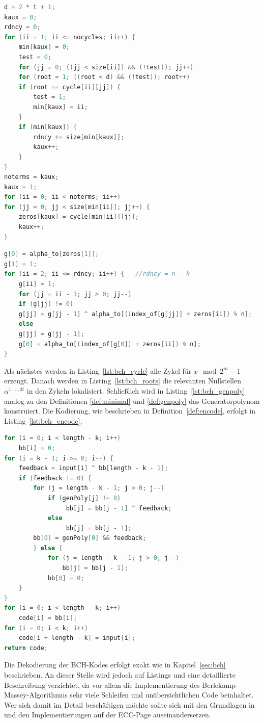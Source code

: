 \begin{lstlisting}[caption=Suchen der Nullstellen in den Zykeln, label={lst:bch_roots}, language=C++]
d = 2 * t + 1;
kaux = 0;
rdncy = 0;
for (ii = 1; ii <= nocycles; ii++) {
    min[kaux] = 0;
    test = 0;
    for (jj = 0; ((jj < size[ii]) && (!test)); jj++)
    for (root = 1; ((root < d) && (!test)); root++)
    if (root == cycle[ii][jj]) {
        test = 1;
        min[kaux] = ii;
    }
    if (min[kaux]) {
        rdncy += size[min[kaux]];
        kaux++;
    }
}
noterms = kaux;
kaux = 1;
for (ii = 0; ii < noterms; ii++)
for (jj = 0; jj < size[min[ii]]; jj++) {
    zeros[kaux] = cycle[min[ii]][jj];
    kaux++;
}
\end{lstlisting}

\begin{lstlisting}[caption=Konstruieren den Generatorpolynoms, label={lst:bch_genpoly}, language=C++]
g[0] = alpha_to[zeros[1]];
g[1] = 1;
for (ii = 2; ii <= rdncy; ii++) {	//rdncy = n - k
    g[ii] = 1;
    for (jj = ii - 1; jj > 0; jj--)
    if (g[jj] != 0)
    g[jj] = g[jj - 1] ^ alpha_to[(index_of[g[jj]] + zeros[ii]) % n];
    else
    g[jj] = g[jj - 1];
    g[0] = alpha_to[(index_of[g[0]] + zeros[ii]) % n];
}
\end{lstlisting}



Als nächstes werden in Listing~\ref{lst:bch_cycle} alle Zykel für $x \mod 2^m-1$ erzeugt. Danach werden in Listing~\ref{lst:bch_roots} die relevanten Nullstellen $\alpha^{1,...,2t}$ in den Zykeln lokalisiert. Schließlich wird in Listing~\ref{lst:bch_genpoly} analog zu den Definitionen \ref{def:minimal} und \ref{def:genpoly} das Generatorpolynom konstruiert. Die Kodierung, wie beschrieben in Definition~\ref{def:encode}, erfolgt in Listing~\ref{lst:bch_encode}.

\begin{lstlisting}[caption=Konstruieren den Generatorpolynoms, label={lst:bch_encode}, language=C++]
for (i = 0; i < length - k; i++)
	bb[i] = 0;
for (i = k - 1; i >= 0; i--) {
    feedback = input[i] ^ bb[length - k - 1];
    if (feedback != 0) {
        for (j = length - k - 1; j > 0; j--)
        	if (genPoly[j] != 0)
       			 bb[j] = bb[j - 1] ^ feedback;
        	else
       			 bb[j] = bb[j - 1];
        bb[0] = genPoly[0] && feedback;
        } else {
        	for (j = length - k - 1; j > 0; j--)
       			bb[j] = bb[j - 1];
        	bb[0] = 0;
    }
}
for (i = 0; i < length - k; i++)
	code[i] = bb[i];
for (i = 0; i < k; i++)
	code[i + length - k] = input[i];
return code;
\end{lstlisting}

Die Dekodierung der BCH-Kodes erfolgt exakt wie in Kapitel~\ref{sec:bch} beschrieben. An dieser Stelle wird jedoch auf Listings und eine detaillierte Beschreibung verzichtet, da vor allem die Implementierung des Berlekamp-Massey-Algorithmus sehr viele Schleifen und unübersichtlichen Code beinhaltet. Wer sich damit im Detail beschäftigen möchte sollte sich mit den Grundlagen in \cite[S. 54ff]{morelos2006art} und den Implementierungen auf der ECC-Page\cite{eccpage} auseinandersetzen.



